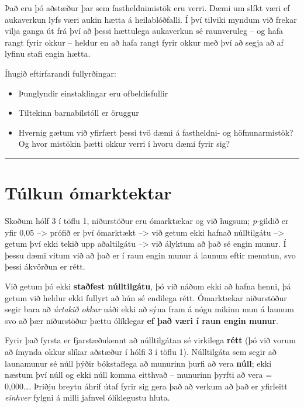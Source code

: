 \documentclass[
]{book}
\begin{document}
Það eru þó aðstæður þar sem fastheldnimistök eru verri. Dæmi um slíkt væri ef aukaverkun lyfs væri aukin hætta á heilablóðfalli. Í því tilviki myndum við frekar vilja ganga út frá því að þessi hættulega aukaverkun sé raunveruleg -- og hafa rangt fyrir okkur -- heldur en að hafa rangt fyrir okkur með því að segja að af lyfinu stafi engin hætta.

Íhugið eftirfarandi fullyrðingar:

\begin{itemize}
\item
  Þunglyndir einstaklingar eru ofbeldisfullir
\item
  Tiltekinn barnabílstóll er öruggur
\item
  Hvernig gætum við yfirfært þessi tvö dæmi á fastheldni- og höfnunarmistök? Og hvor mistökin þætti okkur verri í hvoru dæmi fyrir sig?
\end{itemize}

\begin{center}\rule{0.5\linewidth}{0.5pt}\end{center}

\hypertarget{tuxfalkun-uxf3marktektar}{%
\section{Túlkun ómarktektar}\label{tuxfalkun-uxf3marktektar}}

Skoðum hólf 3 í töflu 1, niðurstöður eru ómarktækar og við hugsum; \emph{p}-gildið er yfir 0,05 --\textgreater{} prófið er því ómarktækt --\textgreater{} við getum ekki hafnað núlltilgátu --\textgreater{} getum því ekki tekið upp aðaltilgátu --\textgreater{} við ályktum að það sé engin munur. Í þessu dæmi vitum við að það er í raun engin munur á launum eftir menntun, svo þessi ákvörðun er rétt.

Við getum þó ekki \textbf{staðfest núlltilgátu}, þó við náðum ekki að hafna henni, þá getum við heldur ekki fullyrt að hún sé endilega rétt. Ómarktækar niðurstöður segir bara að \emph{úrtakið okkar} náði ekki að sýna fram á nógu mikinn mun á launum svo að þær niðurstöður þættu ólíklegar \textbf{ef það væri í raun engin munur}.

Fyrir það fyrsta er fjarstæðukennt að núlltilgátan sé virkilega \textbf{rétt} (þó við vorum að ímynda okkur slíkar aðstæður í hólfi 3 í töflu 1). Núlltilgáta sem segir að launamunur sé núll þýðir bókstaflega að munurinn þurfi að vera \textbf{núll}; ekki næstum því núll og ekki núll komma eitthvað -- munurinn þyrfti að vera = 0,000\ldots. Þriðju breytu áhrif útaf fyrir sig gera það að verkum að það er yfirleitt \emph{einhver} fylgni á milli jafnvel ólíklegustu hluta.
\end{document}
